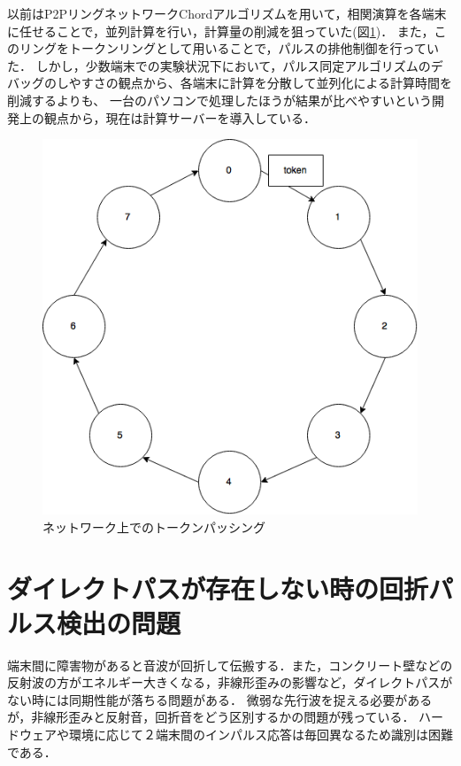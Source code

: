 以前はP2PリングネットワークChordアルゴリズム\cite{chordalg, SHAKER}を用いて，相関演算を各端末に任せることで，並列計算を行い，計算量の削減を狙っていた(図\ref{fig:scheduling})．
また，このリングをトークンリングとして用いることで，パルスの排他制御を行っていた．
しかし，少数端末での実験状況下において，パルス同定アルゴリズムのデバッグのしやすさの観点から、各端末に計算を分散して並列化による計算時間を削減するよりも、
一台のパソコンで処理したほうが結果が比べやすいという開発上の観点から，現在は計算サーバーを導入している．


\begin{figure}[p]\centering
\includegraphics[clip,width=0.85\hsize]{img/chord_ring_network.png}
\caption{ネットワーク上でのトークンパッシング}\label{fig:scheduling}
\end{figure}




\section{ダイレクトパスが存在しない時の回折パルス検出の問題}

端末間に障害物があると音波が回折して伝搬する．また，コンクリート壁などの反射波の方がエネルギー大きくなる，非線形歪みの影響\cite{nonlinear}など，ダイレクトパスがない時には同期性能が落ちる問題がある．
微弱な先行波を捉える必要があるが，非線形歪みと反射音，回折音をどう区別するかの問題が残っている．
ハードウェアや環境に応じて２端末間のインパルス応答は毎回異なるため識別は困難である．

